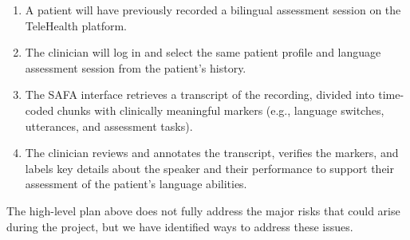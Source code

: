 \documentclass{article}
\begin{document}
\begin{enumerate}
  \item A patient will have previously recorded a bilingual assessment session on the
  TeleHealth platform.
  \item The clinician will log in and select the same patient profile and
  language assessment session from the patient's history.
  \item The SAFA interface retrieves a transcript of the recording, divided into
  time-coded chunks with clinically meaningful markers (e.g., language switches,
  utterances, and assessment tasks).
  \item The clinician reviews and annotates the transcript, verifies the markers, and
  labels key details about the speaker and their performance to support their
  assessment of the patient's language abilities.
\end{enumerate}

The high-level plan above does not fully address the major risks that could arise
during the project, but we have identified ways to address these issues.
\end{document}
